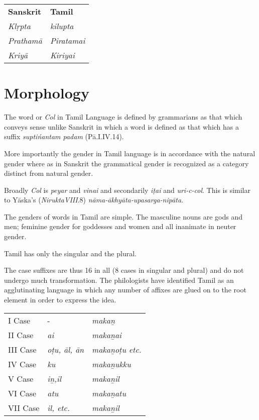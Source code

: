 \begin{longtable}{p{2.5cm}p{2.5cm}}
\textbf{Sanskrit} & \textbf{Tamil} \\
\textit{Klṛpta} & \textit{kilupta} \\
\textit{Prathamā} & \textit{Piratamai} \\
\textit{Kriyā} & \textit{Kiriyai} \\
\end{longtable}


\section*{Morphology}

The word or \textit{Col} in Tamil Language is defined by grammarians as that which conveys sense unlike Sanskrit in which a word is defined as that which has a suffix \textit{suptińantam padam} (Pā.I.IV.14).

More importantly the gender in Tamil language is in accordance with the natural gender where as in Sanskrit the grammatical gender is recognized as a category distinct from natural gender.

Broadly \textit{Col} is \textit{peyar} and \textit{vinai} and secondarily \textit{iṭai} and \textit{uri-c-col}. This is similar to Yāska’s (\textit{NiruktaVIII}.8) \textit{nāma-ākhyāta-upasarga-nipāta}.

The genders of words in Tamil are simple. The masculine nouns are gods and men; feminine gender for goddesses and women and all inanimate in neuter gender.

Tamil has only the singular and the plural.

\newpage

The case suffixes are thus 16 in all (8 cases in singular and plural) and do not undergo much transformation. The philologists have identified Tamil as an agglutinating language in which any number of affixes are glued on to the root element in order to express the idea.

\begin{longtable}{lll}
I Case & - & \textit{makaṉ} \\
II Case  & \textit{ai} & \textit{makaṉai} \\
III Case & \textit{oṭu, āl, ān} & \textit{makaṉoṭu etc.} \\
IV Case & \textit{ku} & \textit{makaṉukku} \\
V Case & \textit{iṉ,il} & \textit{makaṉil} \\
VI Case & \textit{atu} & \textit{makaṉatu} \\
VII Case & \textit{il, etc.} & \textit{makaṉil} \\
\end{longtable}

